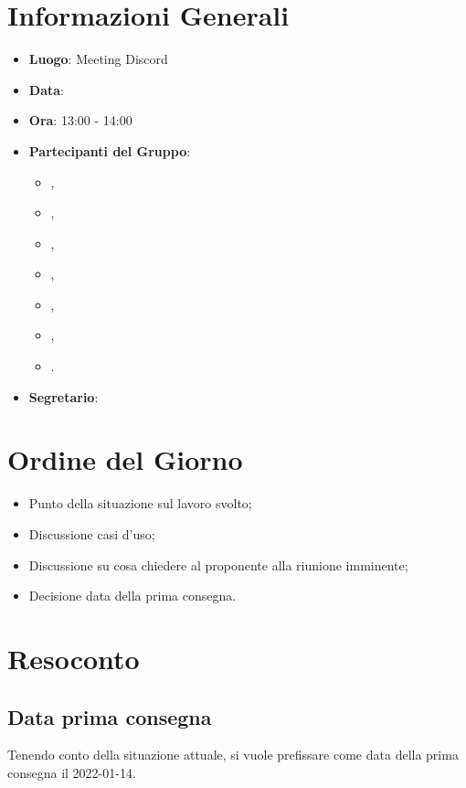 \section{Informazioni Generali}

\begin{itemize}
\item{\textbf{Luogo}}: Meeting Discord
\item{\textbf{Data}}: \D{}
\item{\textbf{Ora}}: 13:00 - 14:00
\item{\textbf{Partecipanti del Gruppo}}: 
	\begin{itemize}
	\item{\EP{},} 
	\item{\FP{},}
	\item{\GC{},}
	\item{\LW{},}
	\item{\MB{},}
	\item{\MG{},}
	\item{\PV{}.}
	\end{itemize} 
\item{\textbf{Segretario}}: \PV{}	
\end{itemize}

\section{Ordine del Giorno}
\begin{itemize}
\item{Punto della situazione sul lavoro svolto;}
\item{Discussione casi d'uso;}
\item{Discussione su cosa chiedere al proponente alla riunione imminente;}
\item{Decisione data della prima consegna.}
\end{itemize}

\section{Resoconto}

\subsection{Data prima consegna}
Tenendo conto della situazione attuale, si vuole prefissare come data della prima consegna il 2022-01-14.